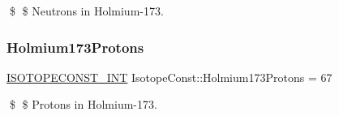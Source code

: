 \$ \$ Neutrons in Holmium-\/173. \mbox{\label{group___isotope_const-_holmium-_ho173_ga102e1c3ce5d91e3f0d18ea3a7c48b168}} 
\subsubsection{\texorpdfstring{Holmium173\+Protons}{Holmium173Protons}}
{\footnotesize\ttfamily \mbox{\hyperlink{group___isotope_const-_macros_ga5f18360b3e99483a35c32d789e62621c}{I\+S\+O\+T\+O\+P\+E\+C\+O\+N\+S\+T\+\_\+\+I\+NT}} Isotope\+Const\+::\+Holmium173\+Protons = 67}

\$ \$ Protons in Holmium-\/173. 